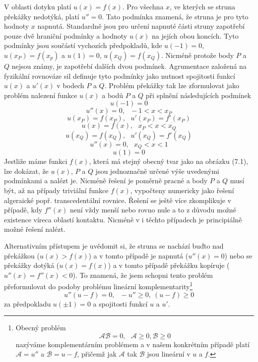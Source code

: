 \documentclass[a4paper]{book}
\begin{document}
V oblasti dotyku platí $u(x) = f(x)$. Pro všechna $x$, ve kterých se struna překážky nedotýká, platí $u'' = 0$. Tato podmínka znamená, že struna je pro tyto hodnoty $x$ napnutá. Standardně jsou pro určení napnuté části struny zapotřebí pouze dvě hraniční podmínky a hodnoty $u(x)$ na jejích obou koncích. Tyto podmínky jsou součástí vychozích předpokladů, kde $u(-1) = 0$, $u(x_P) = f(x_p)$ a $u(1) = 0$, $u(x_Q) = f(x_Q)$. Nicméně protože body $P$ a $Q$ nejsou známy, je zapotřebí dalších dvou podmínek. Agrumentace založená na fyzikální rovnováze sil definuje tyto podmínky jako nutnost spojitosti funkcí $u(x)$ a $u'(x)$ v bodech $P$ a $Q$. Problém překážky tak lze zformulovat jako problém nalezení funkce $u(x)$ a bodů $P$ a $Q$ při splnění následujících podmínek
\begin{equation}
u(-1) = 0
\end{equation}
\begin{equation}
u''(x) = 0,~~~ -1 < x < x_P
\end{equation}
\begin{equation}
u(x_P) = f(x_P),~~~u'(x_P) = f'(x_P)
\end{equation}
\begin{equation}
u(x) = f(x),~~~x_P < x < x_Q
\end{equation}
\begin{equation}
u(x_Q) = f(x_Q),~~~u'(x_Q) = f'(x_Q)
\end{equation}
\begin{equation}
u''(x) = 0,~~~ x_Q < x < 1
\end{equation}
\begin{equation}
u(1) = 0
\end{equation}
Jestliže máme funkci $f(x)$, která má stejný obecný tvar jako na obrázku (7.1), lze dokázat, že $u(x)$, $P$ a $Q$ jsou jednoznačně určené výše uvedenými podmínkami a nalézt je. Nicméně řešení je poměrně pracné a body $P$ a $Q$ musí být, až na případy triviální funkce $f(x)$, vypočteny numericky jako řešení algeraické popř. transcedentální rovnice. Řešení se ještě více zkomplikuje v případě, kdy $f''(x)$ není vždy menší nebo rovno nule a to z důvodu možné existence víreca oblastí kontaktu. Nicméně v i těchto případech je principiálně možné řešení nalézt.

Alternativním přístupem je uvědomit si, že struna se nachází buďto nad překážkou ($u(x) > f(x)$) a v tomto případě je napnutá ($u''(x) = 0$) nebo se překážky dotýká ($u(x) = f(x)$) a v tomto případě překážku kopíruje ($u''(x) = f''(x) < 0$). To znamená, že jsem schopni tento problém přeformulovat do podoby problému lineární komplementarity\footnote{Obecný problém
\begin{equation*}
\mathcal{AB} = 0,~~~\mathcal{A} \ge 0, \mathcal{B} \ge 0 
\end{equation*}
nazýváme komplementárním problémem a v našem konkrétním případě platí $\mathcal{A} = u''$ a $\mathcal{B} = u - f$, přičemž jak $\mathcal{A}$ tak $\mathcal{B}$ jsou lineární v $u$ a $f$.
}
\begin{equation*}
u'' (u - f) = 0,~~~-u'' \ge 0,~(u - f) \ge 0
\end{equation*}
za předpokladu $u(\pm 1) = 0$ a spojitosti funkcí $u$ a $u'$.
\end{document}
